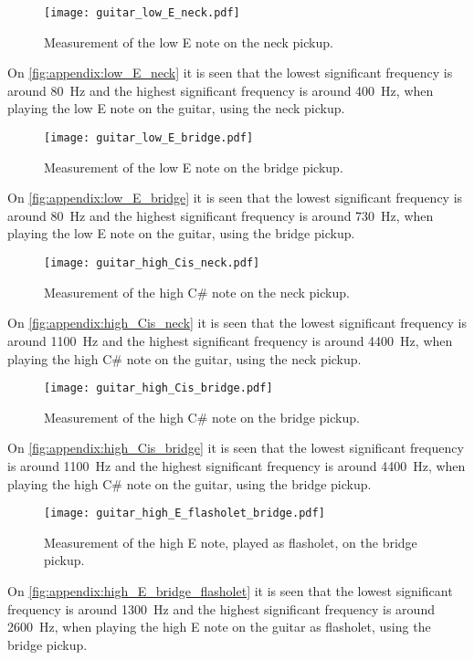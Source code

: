 \begin{figure}[htbp!]
	\centering
		\texttt{[image: guitar\_low\_E\_neck.pdf]}
		\caption{Measurement of the low E note on the neck pickup.}
		\label{fig:appendix:low_E_neck}
\end{figure}

On  \autoref{fig:appendix:low_E_neck} it is seen that the lowest significant frequency is around \SI{80}{\hertz} and the highest significant frequency is around \SI{400}{\hertz}, when playing the low E note on the guitar, using the neck pickup.

\begin{figure}[htbp!]
	\centering
		\texttt{[image: guitar\_low\_E\_bridge.pdf]}
		\caption{Measurement of the low E note on the bridge pickup.}
		\label{fig:appendix:low_E_bridge}
\end{figure}

On  \autoref{fig:appendix:low_E_bridge} it is seen that the lowest significant frequency is around \SI{80}{\hertz} and the highest significant frequency is around \SI{730}{\hertz}, when playing the low E note on the guitar, using the bridge pickup.

\begin{figure}[htbp!]
	\centering
		\texttt{[image: guitar\_high\_Cis\_neck.pdf]}
		\caption{Measurement of the high C\# note on the neck pickup.}
		\label{fig:appendix:high_Cis_neck}
\end{figure}

On  \autoref{fig:appendix:high_Cis_neck} it is seen that the lowest significant frequency is around \SI{1100}{\hertz} and the highest significant frequency is around \SI{4400}{\hertz}, when playing the high C\# note on the guitar, using the neck pickup.

\begin{figure}[htbp!]
	\centering
		\texttt{[image: guitar\_high\_Cis\_bridge.pdf]}
		\caption{Measurement of the high C\# note on the bridge pickup.}
		\label{fig:appendix:high_Cis_bridge}
\end{figure}

On  \autoref{fig:appendix:high_Cis_bridge} it is seen that the lowest significant frequency is around \SI{1100}{\hertz} and the highest significant frequency is around \SI{4400}{\hertz}, when playing the high C\# note on the guitar, using the bridge pickup.

\begin{figure}[htbp!]
	\centering
		\texttt{[image: guitar\_high\_E\_flasholet\_bridge.pdf]}
		\caption{Measurement of the high E note, played as flasholet, on the bridge pickup.}
		\label{fig:appendix:high_E_bridge_flasholet}
\end{figure}

On  \autoref{fig:appendix:high_E_bridge_flasholet} it is seen that the lowest significant frequency is around \SI{1300}{\hertz} and the highest significant frequency is around \SI{2600}{\hertz}, when playing the high E note on the guitar as flasholet, using the bridge pickup. 
